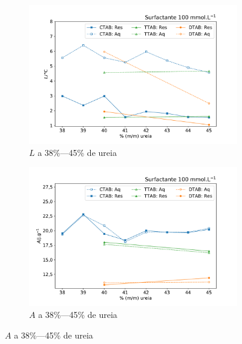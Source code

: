 	\begin{figure}[H]
		\centering
		\begin{subfigure}[t]{0.60\textwidth}
			\includegraphics[width=\textwidth]{./imagens/dsc/L_100mM_aq_res}
			\caption{$L$ a 38\%---45\% de ureia}
			\label{fig:DSC_L_38_45pUr}
		\end{subfigure}
		
		\begin{subfigure}[t]{0.60\textwidth}
			\includegraphics[width=\textwidth]{./imagens/dsc/A_100mM_aq_res}
			\caption{$A$ a 38\%---45\% de ureia}
			\label{fig:DSC_A_38_45pUr}
		\end{subfigure} 
		

\end{figure}

